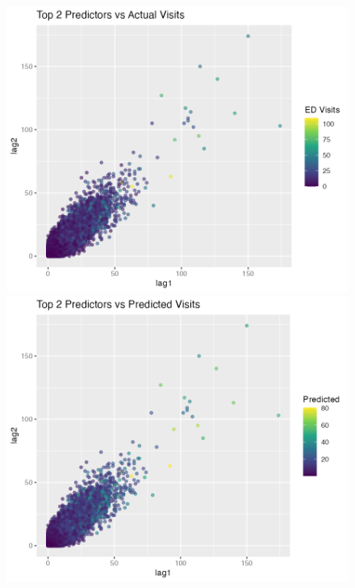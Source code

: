 \documentclass[11pt]{article}
\begin{document}
\begin{figure}[H]
  \centering
  \begin{minipage}[b]{0.32\textwidth}
    \centering
    \includegraphics[width=\textwidth]{plot_actual_vs_top2.png}
  \end{minipage}\hfill
  \begin{minipage}[b]{0.32\textwidth}
    \centering
    \includegraphics[width=\textwidth]{plot_predicted_vs_top2.png}

\end{minipage}
\end{figure}
\end{document}
